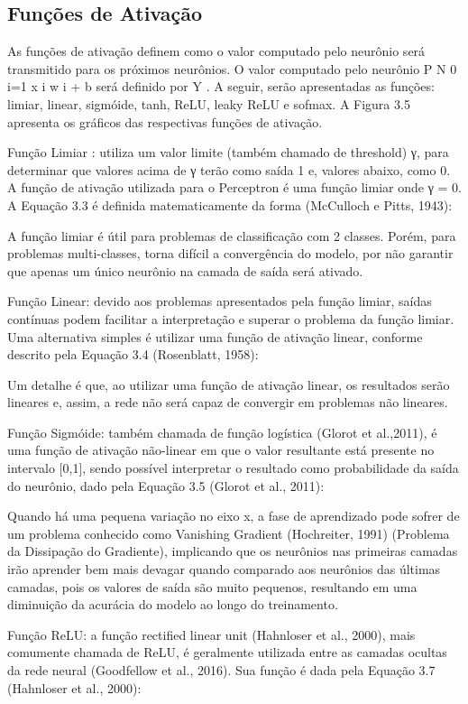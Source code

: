 \subsection{Funções de Ativação}

As funções de ativação definem como o valor computado pelo neurônio será transmitido para os próximos neurônios. O valor computado pelo neurônio P N 0 i=1 x i w i + b será definido por Y . A seguir, serão apresentadas as funções: limiar, linear, sigmóide, tanh, ReLU, leaky ReLU e sofmax. A Figura 3.5 apresenta os gráficos das respectivas funções de ativação.

Função Limiar : utiliza um valor limite (também chamado de threshold) γ, para determinar que valores acima de γ terão como saída 1 e, valores abaixo, como 0. A função de ativação utilizada para o Perceptron é uma função limiar onde γ = 0. A Equação 3.3 é definida matematicamente da forma (McCulloch e Pitts, 1943):

A função limiar é útil para problemas de classificação com 2 classes. Porém, para problemas multi-classes, torna difícil a convergência do modelo, por não garantir que apenas um único neurônio na camada de saída será ativado.

Função Linear: devido aos problemas apresentados pela função limiar, saídas contínuas podem facilitar a interpretação e superar o problema da função limiar. Uma alternativa simples é utilizar uma função de ativação linear, conforme descrito pela Equação 3.4 (Rosenblatt, 1958):

Um detalhe é que, ao utilizar uma função de ativação linear, os resultados serão lineares e, assim, a rede não será capaz de convergir em problemas não lineares.

Função Sigmóide: também chamada de função logística (Glorot et al.,2011), é uma função de ativação não-linear em que o valor resultante está presente no intervalo [0,1], sendo possível interpretar o resultado como probabilidade da saída do neurônio, dado pela Equação 3.5 (Glorot et al., 2011):

Quando há uma pequena variação no eixo x, a fase de aprendizado pode sofrer de um problema conhecido como Vanishing Gradient (Hochreiter, 1991) (Problema da Dissipação do Gradiente), implicando que os neurônios nas primeiras camadas irão aprender bem mais devagar quando comparado aos neurônios das últimas camadas, pois os valores de saída são muito pequenos, resultando em uma diminuição da acurácia do modelo ao longo do treinamento.

Função ReLU: a função rectified linear unit (Hahnloser et al., 2000), mais comumente chamada de ReLU, é geralmente utilizada entre as camadas ocultas da rede neural (Goodfellow et al., 2016). Sua função é dada pela Equação 3.7 (Hahnloser et al., 2000):

